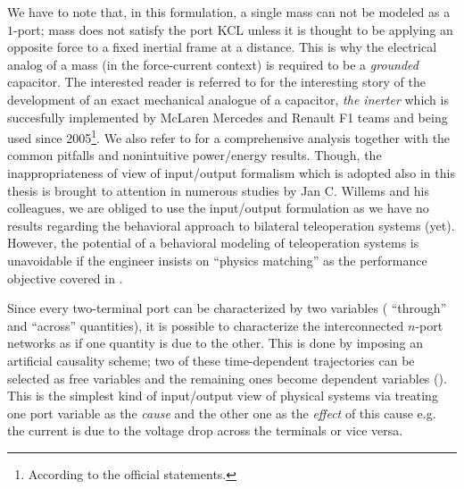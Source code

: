 \begin{rem}
We have to note that, in this formulation, a single mass can not be modeled as a $1$-port; mass does not satisfy the 
port KCL unless it is thought to be applying an opposite force to a fixed inertial frame at a distance. This is why the electrical analog 
of a mass (in the force-current context) is required to be a \emph{grounded} capacitor. The interested reader is referred to \cite{smith} 
for the interesting story of the development of an exact mechanical analogue of a capacitor, \emph{the inerter} which is succesfully implemented by 
McLaren Mercedes and Renault F1 teams and being used since 2005\footnote{According to the official statements.}. We also refer to 
\cite{willemsCSM} for a comprehensive analysis together with the common pitfalls and nonintuitive power/energy results. Though, 
the inappropriateness of view of input/output formalism which is adopted also in this thesis is brought to attention in numerous 
studies by Jan C. Willems and his colleagues, we are obliged to use the input/output formulation as we have no results regarding 
the behavioral approach to bilateral teleoperation systems (yet). However, the potential of a behavioral modeling of teleoperation 
systems is unavoidable if the engineer insists on \enquote{physics matching} as the performance objective covered in .
\end{rem}


Since every two-terminal port can be characterized by two variables ( ``through'' and ``across'' quantities), it is possible to 
characterize the interconnected $n$-port networks as if one quantity is due to the other. This is done by imposing an artificial 
causality scheme; two of these time-dependent trajectories can be selected as free variables and the remaining ones become dependent variables 
(\cite{behavbook}). This is the simplest kind of input/output view of physical systems via treating one port variable as the 
\emph{cause} and the other one as the \emph{effect} of this cause e.g. the current is due to the voltage drop across the terminals or 
vice versa. 

